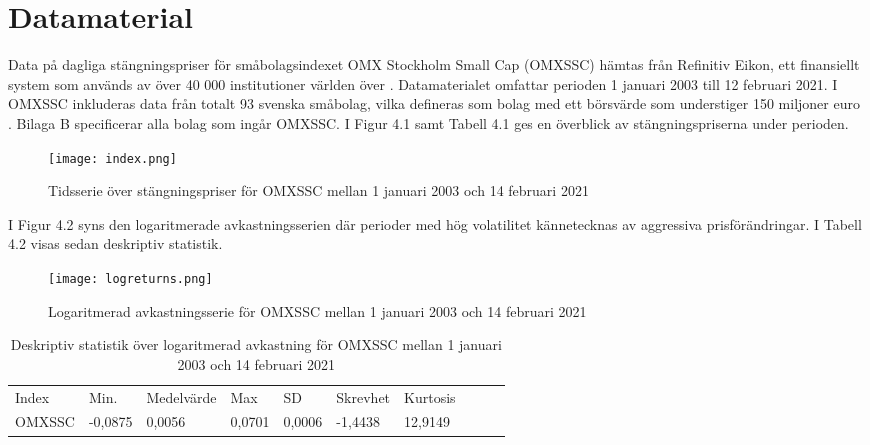 \documentclass[11pt]{article}
\numberwithin{equation}{section}
\numberwithin{table}{section}
\numberwithin{figure}{section}
\begin{document}
\section{Datamaterial}

Data på dagliga stängningspriser för småbolagsindexet OMX Stockholm Small Cap (OMXSSC) hämtas från Refinitiv Eikon, ett finansiellt system som används av över 40 000 institutioner världen över \parencite{Eikon}. Datamaterialet omfattar perioden 1 januari 2003 till 12 februari 2021. I OMXSSC inkluderas data från totalt 93 svenska småbolag, vilka defineras som bolag med ett börsvärde som understiger 150 miljoner euro \parencite{smabalagsdefinition}. Bilaga B specificerar alla bolag som ingår OMXSSC. I Figur 4.1 samt Tabell 4.1 ges en överblick av stängningspriserna under perioden. 

\begin{figure}[H]
\caption{Tidsserie över stängningspriser för OMXSSC mellan 1 januari 2003 och 14 februari 2021}
\texttt{[image: index.png]}
\centering
\end{figure}


\begin{table}[H]
\caption{Deskprivtiv statistik över stängningspriser för OMXSSC mellan 1 januari 2003 och 14 februari 2021}
\end{table}

I Figur 4.2 syns den logaritmerade avkastningsserien där perioder med hög volatilitet kännetecknas av aggressiva prisförändringar. I Tabell 4.2 visas sedan deskriptiv statistik. 

\begin{figure}[H]
\caption{Logaritmerad avkastningsserie för OMXSSC mellan 1 januari 2003 och 14 februari 2021}
\texttt{[image: logreturns.png]}
\centering
\end{figure}


\begin{table}[H]
\caption{Deskriptiv statistik över logaritmerad avkastning för OMXSSC mellan 1 januari 2003 och 14 februari 2021}
\begin{tabular}{@{}llllllllll@{}}
\cmidrule(r){1-7}
%
Index  & Min.    & Medelvärde & Max    & SD     & Skrevhet & Kurtosis \\ \cmidrule(r){1-7}
OMXSSC & -0,0875 & 0,0056     & 0,0701 & 0,0006 & -1,4438  & 12,9149  \\ \cmidrule(r){1-7}
\end{tabular}
\end{table}
\end{document}
